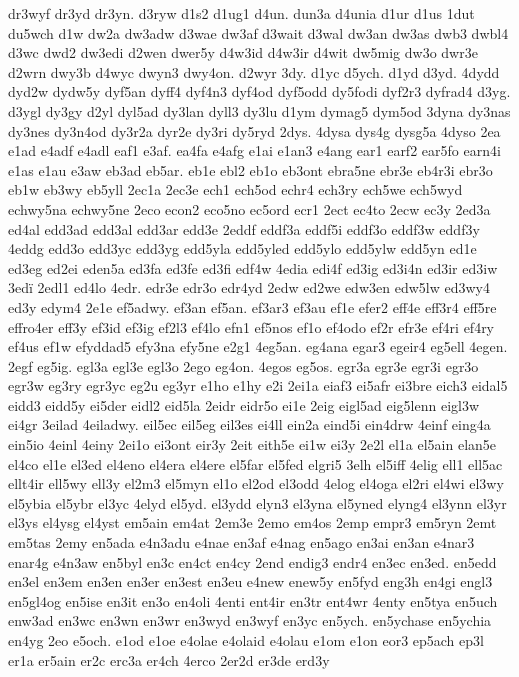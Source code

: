 {dr3wyf
dr3yd
dr3yn.
d3ryw
d1s2
d1ug1
d4un.
dun3a
d4unia
d1ur
d1us
1dut
du5wch
d1w
dw2a
dw3adw
d3wae
dw3af
d3wait
d3wal
dw3an
dw3as
dwb3
dwbl4
d3wc
dwd2
dw3edi
d2wen
dwer5y
d4w3id
d4w3ir
d4wit
dw5mig
dw3o
dwr3e
d2wrn
dwy3b
d4wyc
dwyn3
dwy4on.
d2wyr
3dy.
d1yc
d5ych.
d1yd
d3yd.
4dydd
dyd2w
dydw5y
dyf5an
dyff4
dyf4n3
dyf4od
dyf5odd
dy5fodi
dyf2r3
dyfrad4
d3yg.
d3ygl
dy3gy
d2yl
dyl5ad
dy3lan
dyll3
dy3lu
d1ym
dymag5
dym5od
3dyna
dy3nas
dy3nes
dy3n4od
dy3r2a
dyr2e
dy3ri
dy5ryd
2dys.
4dysa
dys4g
dysg5a
4dyso
2ea
e1ad
e4adf
e4adl
eaf1
e3af.
ea4fa
e4afg
e1ai
e1an3
e4ang
ear1
earf2
ear5fo
earn4i
e1as
e1au
e3aw
eb3ad
eb5ar.
eb1e
ebl2
eb1o
eb3ont
ebra5ne
ebr3e
eb4r3i
ebr3o
eb1w
eb3wy
eb5yll
2ec1a
2ec3e
ech1
ech5od
echr4
ech3ry
ech5we
ech5wyd
echwy5na
echwy5ne
2eco
econ2
eco5no
ec5ord
ecr1
2ect
ec4to
2ecw
ec3y
2ed3a
ed4al
edd3ad
edd3al
edd3ar
edd3e
2eddf
eddf3a
eddf5i
eddf3o
eddf3w
eddf3y
4eddg
edd3o
edd3yc
edd3yg
edd5yla
edd5yled
edd5ylo
edd5ylw
edd5yn
ed1e
ed3eg
ed2ei
eden5a
ed3fa
ed3fe
ed3fi
edf4w
4edia
edi4f
ed3ig
ed3i4n
ed3ir
ed3iw
3edï
2edl1
ed4lo
4edr.
edr3e
edr3o
edr4yd
2edw
ed2we
edw3en
edw5lw
ed3wy4
ed3y
edym4
2e1e
ef5adwy.
ef3an
ef5an.
ef3ar3
ef3au
ef1e
efer2
eff4e
eff3r4
eff5re
effro4er
eff3y
ef3id
ef3ig
ef2l3
ef4lo
efn1
ef5nos
ef1o
ef4odo
ef2r
efr3e
ef4ri
ef4ry
ef4us
ef1w
efyddad5
efy3na
efy5ne
e2g1
4eg5an.
eg4ana
egar3
egeir4
eg5ell
4egen.
2egf
eg5ig.
egl3a
egl3e
egl3o
2ego
eg4on.
4egos
eg5os.
egr3a
egr3e
egr3i
egr3o
egr3w
eg3ry
egr3yc
eg2u
eg3yr
e1ho
e1hy
e2i
2ei1a
eiaf3
ei5afr
ei3bre
eich3
eidal5
eidd3
eidd5y
ei5der
eidl2
eid5la
2eidr
eidr5o
ei1e
2eig
eigl5ad
eig5lenn
eigl3w
ei4gr
3eilad
4eiladwy.
eil5ec
eil5eg
eil3es
ei4ll
ein2a
eind5i
ein4drw
4einf
eing4a
ein5io
4einl
4einy
2ei1o
ei3ont
eir3y
2eit
eith5e
ei1w
ei3y
2e2l
el1a
el5ain
elan5e
el4co
el1e
el3ed
el4eno
el4era
el4ere
el5far
el5fed
elgri5
3elh
el5iff
4elig
ell1
ell5ac
ellt4ir
ell5wy
ell3y
el2m3
el5myn
el1o
el2od
el3odd
4elog
el4oga
el2ri
el4wi
el3wy
el5ybia
el5ybr
el3yc
4elyd
el5yd.
el3ydd
elyn3
el3yna
el5yned
elyng4
el3ynn
el3yr
el3ys
el4ysg
el4yst
em5ain
em4at
2em3e
2emo
em4os
2emp
empr3
em5ryn
2emt
em5tas
2emy
en5ada
e4n3adu
e4nae
en3af
e4nag
en5ago
en3ai
en3an
e4nar3
enar4g
e4n3aw
en5byl
en3c
en4ct
en4cy
2end
endig3
endr4
en3ec
en3ed.
en5edd
en3el
en3em
en3en
en3er
en3est
en3eu
e4new
enew5y
en5fyd
eng3h
en4gi
engl3
en5gl4og
en5ise
en3it
en3o
en4oli
4enti
ent4ir
en3tr
ent4wr
4enty
en5tya
en5uch
enw3ad
en3wc
en3wn
en3wr
en3wyd
en3wyf
en3yc
en5ych.
en5ychase
en5ychia
en4yg
2eo
e5och.
e1od
e1oe
e4olae
e4olaid
e4olau
e1om
e1on
eor3
ep5ach
ep3l
er1a
er5ain
er2c
erc3a
er4ch
4erco
2er2d
er3de
erd3y
}

